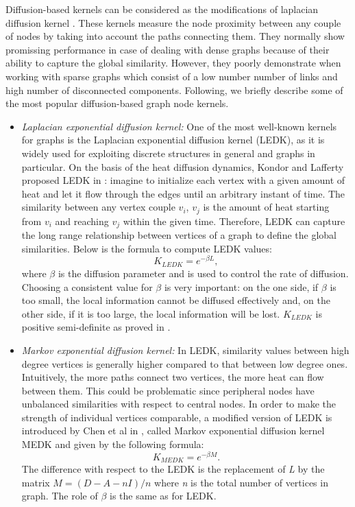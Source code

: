 \documentclass[runningheads,a4paper]{llncs}
\begin{document}
Diffusion-based kernels can be considered as the modifications of laplacian diffusion kernel \cite{proceeding2}. These kernels measure the node proximity between any couple of nodes by taking into account the paths connecting them. They normally show promissing performance in case of dealing with dense graphs because of their ability to capture the global similarity. However, they poorly demonstrate when working with sparse graphs which consist of a low number number of links and high number of disconnected components. Following, we briefly describe some of the most popular diffusion-based graph node kernels.
\begin{itemize}
\item \textit{Laplacian exponential diffusion kernel:} One of the most well-known kernels for graphs is the Laplacian exponential diffusion kernel (LEDK), as it is widely used for exploiting discrete structures in general and graphs in particular. On the basis of the heat diffusion dynamics, Kondor and Lafferty proposed LEDK in \cite{proceeding2}: imagine to initialize each vertex with a given amount of heat and let it flow through the edges until an arbitrary instant of time. The similarity between any vertex couple $v_{i}$, $v_{j}$ is the amount of heat starting from $v_{i}$ and reaching $v_{j}$ within the given time. Therefore, LEDK can capture the long range relationship between vertices of a graph to define the global similarities. Below is the formula to compute LEDK values:
\begin{equation}
K_{LEDK} = e^{-\beta L},
\end{equation}
where $\beta$ is the diffusion parameter and is used to control the rate of diffusion. Choosing a consistent value for $\beta$ is very important: on the one side, if $\beta$ is too small, the local information cannot be diffused effectively and, on the other side, if it is too large, the local information will be lost. $K_{LEDK}$ is positive semi-definite as proved in \cite{proceeding2}.

\item \textit{Markov exponential diffusion kernel:} In LEDK, similarity values between high degree vertices is generally higher compared to that between low degree ones. Intuitively, the more paths connect two vertices, the more heat can flow between them. This could be problematic since peripheral nodes have unbalanced similarities with respect to central nodes. In order to make the strength of individual vertices comparable, a modified version of LEDK is introduced by Chen et al in \cite{proceeding3}, called Markov exponential diffusion kernel MEDK and given by the following formula:
\begin{equation}
K_{MEDK} = e^{-\beta M}.
\end{equation}
The difference with respect to the LEDK is the replacement of \textit{L} by the matrix $M = (D-A-nI)/n$ where \textit{n} is the total number of vertices in graph. The role of $\beta$ is the same as for LEDK.


\end{itemize}
\end{document}
